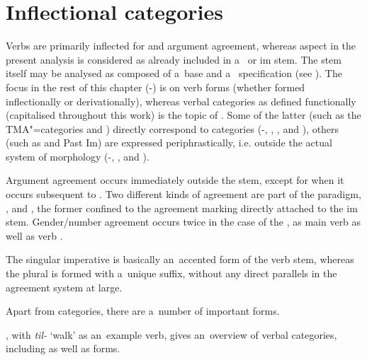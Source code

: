 \section{Inflectional categories}
\label{sec:8-4}

Verbs are primarily inflected for  and argument agreement, whereas aspect in the present analysis is considered as already included in a~ or im stem. The stem itself may be analysed as composed of a~base and a~ specification (see ). The focus in the rest of this chapter (-) is on verb forms (whether formed inflectionally or derivationally), whereas verbal categories as defined functionally (capitalised throughout this work) is the topic of . Some of the latter (such as the TMA"=categories  and ) directly correspond to  categories (-, , , and ), others (such as  and Past Im) are expressed periphrastically, i.e. outside the actual system of  morphology (-, , and ). 


Argument agreement occurs immediately outside the stem, except for when it occurs subsequent to  . Two different kinds of agreement are part of the paradigm, , and , the former confined to the agreement marking directly attached to the im stem. Gender/number agreement occurs twice in the case of the , as main verb  as well as  verb . 


The singular imperative is basically an~accented form of the verb stem, whereas the plural is formed with a~unique suffix, without any direct parallels in the agreement system at large.


Apart from   categories, there are a~number of important  forms.


, with \textit{til-} `walk' as an~example verb, gives an~overview of verbal  categories, including  as well as  forms.


